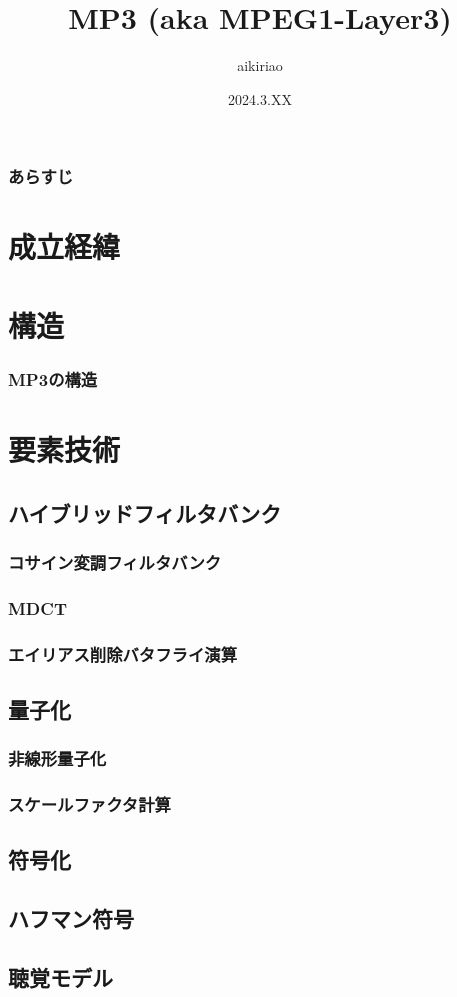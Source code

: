 \documentclass[17pt,xcolor=dvipsnames,table,dvipdfmx]{beamer}
\title{MP3 (aka MPEG1-Layer3)}
\author[aikiriao]{aikiriao}
\date{2024.3.XX}
\begin{document}
\maketitle

\begin{frame}[c]
    \frametitle{あらすじ}
    \tableofcontents
\end{frame}

\section{成立経緯}
\section{構造}

\begin{frame}[c]
    \frametitle{MP3の構造}
\end{frame}

\section{要素技術}
\subsection{ハイブリッドフィルタバンク}
\subsubsection{コサイン変調フィルタバンク}
\subsubsection{MDCT}
\subsubsection{エイリアス削除バタフライ演算}
\subsection{量子化}
\subsubsection{非線形量子化}
\subsubsection{スケールファクタ計算}
\subsection{符号化}
\subsection{ハフマン符号}
\subsection{聴覚モデル}
\end{document}
